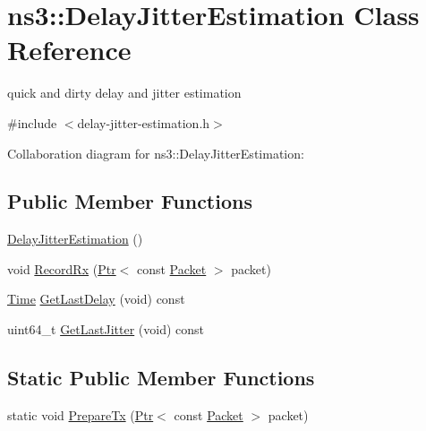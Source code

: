 \hypertarget{classns3_1_1DelayJitterEstimation}{}\section{ns3\+:\+:Delay\+Jitter\+Estimation Class Reference}
\label{classns3_1_1DelayJitterEstimation}


quick and dirty delay and jitter estimation  




{\ttfamily \#include $<$delay-\/jitter-\/estimation.\+h$>$}



Collaboration diagram for ns3\+:\+:Delay\+Jitter\+Estimation\+:
\subsection*{Public Member Functions}
\begin{DoxyCompactItemize}
\item 
\hyperlink{classns3_1_1DelayJitterEstimation_a30dc40f5f81bcc3f8a8f49ff44f22cbc}{Delay\+Jitter\+Estimation} ()
\item 
void \hyperlink{classns3_1_1DelayJitterEstimation_a2ed3a248d9cee91c92690793378b5797}{Record\+Rx} (\hyperlink{classns3_1_1Ptr}{Ptr}$<$ const \hyperlink{classns3_1_1Packet}{Packet} $>$ packet)
\item 
\hyperlink{classns3_1_1Time}{Time} \hyperlink{classns3_1_1DelayJitterEstimation_aa4af6dbec8f192a969499e5b82d28fa3}{Get\+Last\+Delay} (void) const 
\item 
uint64\+\_\+t \hyperlink{classns3_1_1DelayJitterEstimation_a92d1f80a86286682a473ee76d9d9f06b}{Get\+Last\+Jitter} (void) const 
\end{DoxyCompactItemize}
\subsection*{Static Public Member Functions}
\begin{DoxyCompactItemize}
\item 
static void \hyperlink{classns3_1_1DelayJitterEstimation_a38cbbdbfcdcc81cc9e08e3a9e2d10e75}{Prepare\+Tx} (\hyperlink{classns3_1_1Ptr}{Ptr}$<$ const \hyperlink{classns3_1_1Packet}{Packet} $>$ packet)
\end{DoxyCompactItemize}
